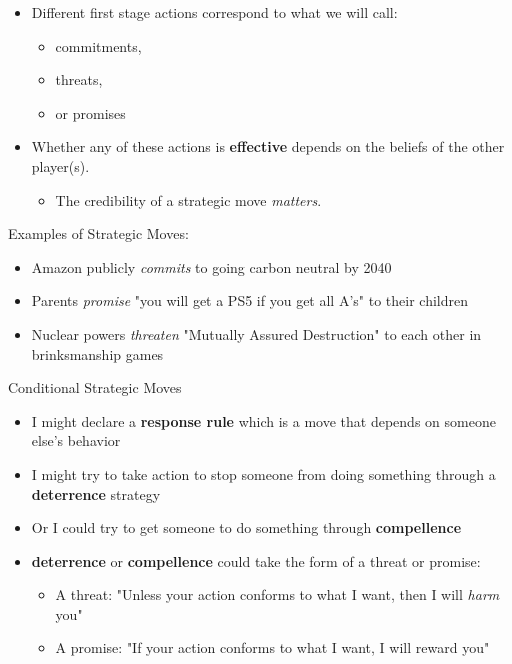 \documentclass{beamer}
\theoremstyle{plain}
\begin{document}
\begin{frame}{}
  \begin{itemize}
    \item Different first stage actions correspond to what we will call:
    \begin{itemize}
      \item \alert{commitments},
      \item \alert{threats},
      \item or \alert{promises}
    \end{itemize}
    \item Whether any of these actions is \textbf{effective}
    depends on the beliefs of the other player(s).
    \begin{itemize}
      \item The \alert{credibility} of a strategic move \textit{matters}.
    \end{itemize}
  \end{itemize} 
\end{frame}


\begin{frame}{}
  Examples of Strategic Moves:
  \begin{itemize}
    \item Amazon publicly \textit{commits} to going carbon neutral by 2040
    \item Parents \textit{promise} "you will get a PS5 if you get all A's" 
    to their children
    \item Nuclear powers \textit{threaten} "Mutually Assured Destruction"
    to each other in \alert{brinksmanship} games
  \end{itemize}
\end{frame}


\begin{frame}{}
  Conditional Strategic Moves 
  \begin{itemize}
    \item I might declare a \textbf{response rule} 
    which is a move that depends on someone else's behavior
    \item I might try to take action to stop someone from doing something 
    through a \textbf{deterrence} strategy
    \item Or I could try to get someone to do something 
    through \textbf{compellence}
    \item \textbf{deterrence} or \textbf{compellence} could take the form 
    of a \alert{threat} or \alert{promise}:
    \begin{itemize}
      \item A \alert{threat}: 
      "Unless your action conforms to what I want, then I will \textit{harm} you"
      \item A \alert{promise}:
      "If your action conforms to what I want, I will \alert{reward} you"
    \end{itemize}
  \end{itemize}
\end{frame}
\end{document}
